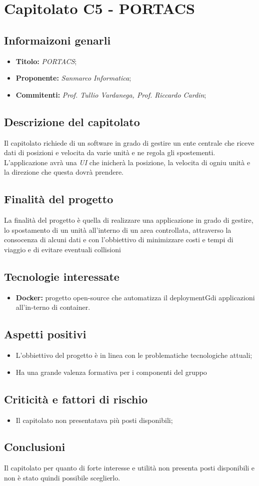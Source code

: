 \section{Capitolato C5 - PORTACS}
\subsection{Informaizoni genarli}
\begin{itemize}
    \item \textbf{Titolo:} \textit{PORTACS};
    \item \textbf{Proponente:} \textit{Sanmarco Informatica};
    \item \textbf{Commitenti:} \textit{Prof. Tullio Vardanega, Prof. Riccardo Cardin};
\end{itemize}
\subsection{Descrizione del capitolato}
Il capitolato richiede di un software in grado di gestire un ente centrale che riceve dati 
di posizioni e velocita da varie unità e ne regola gli spostementi. L'applicazione avrà una \textit{UI} che inicherà 
la posizione, la velocita di ogniu unità e la direzione che questa dovrà prendere.
\subsection{Finalità del progetto}
La finalità del progetto è quella di realizzare una applicazione in grado di gestire, lo spostamento di un unità all'interno di un area controllata,
attraverso la consocenza di alcuni dati e con l'obbiettivo di minimizzare costi e tempi di viaggio e di evitare eventuali collisioni
\subsection{Tecnologie interessate}
\begin{itemize}
    \item \textbf{Docker:} progetto open-source che automatizza il deploymentGdi applicazioni all’in-terno di container.
\end{itemize}
\subsection{Aspetti positivi}
\begin{itemize}
    \item L'obbiettivo del progetto è in linea con le problematiche tecnologiche attuali;
    \item Ha una grande valenza formativa per i componenti del gruppo
\end{itemize}
\subsection{Criticità e fattori di rischio}
\begin{itemize}
    \item Il capitolato non presentatava più posti disponibili;
\end{itemize}
\subsection{Conclusioni}
Il capitolato per quanto di forte interesse e utilità non presenta posti disponibili e non è stato quindi possibile sceglierlo.